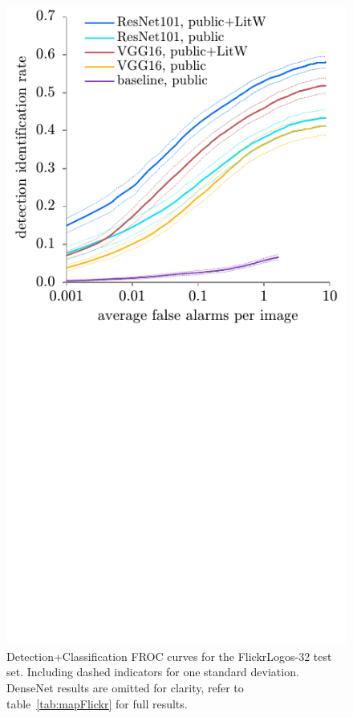 \documentclass[a4paper,twoside]{article}
\begin{document}
%
\begin{figure}%
\centering%
\includegraphics[width=\linewidth, trim=0cm 7.4cm 0cm 0cm, clip]{img/classificationFroc.pdf}%
\caption{Detection+Classification FROC curves for the FlickrLogos-32 test set. Including dashed indicators for one standard deviation. DenseNet results are omitted for clarity, refer to table~\ref{tab:mapFlickr} for full results.}%
\label{fig:classificationFroc}
\end{figure}%
%
\end{document}
